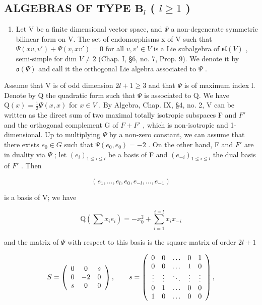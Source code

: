\subsection{\texorpdfstring{ALGEBRAS OF TYPE \(\mathbf{B}_l\) ( \(l \geq 1\) )}{ALGEBRAS OF TYPE \textbackslash mathbf\{B\}\_l ( l \textbackslash geq 1 )}}

\begin{enumerate}
\def\labelenumi{(\Roman{enumi})}
\tightlist
\item
  Let V be a finite dimensional vector space, and \(\Psi\) a non-degenerate symmetric bilinear form on V. The set of endomorphisms x of V such that \(\Psi(xv,v') + \Psi(v, xv') = 0\) for all \(v, v' \in V\) is a Lie subalgebra of \(\mathfrak{sl}(V)\) , semi-simple for dim \(V \neq 2\) (Chap. I, §6, no. 7, Prop. 9). We denote it by \(\mathfrak{o}(\Psi)\) and call it the orthogonal Lie algebra associated to \(\Psi\) .
\end{enumerate}

Assume that V is of odd dimension \(2l + 1 \geq 3\) and that \(\Psi\) is of maximum index l. Denote by Q the quadratic form such that \(\Psi\) is associated to Q. We have \(\mathrm{Q}(x)=\frac{1}{2}\varPsi(x,x)\) for \(x\in V\) . By Algebra, Chap. IX, §4, no. 2, V can be written as the direct sum of two maximal totally isotropic subspaces F and \(F'\) and the orthogonal complement G of \(F+F'\) , which is non-isotropic and 1-dimensional. Up to multiplying \(\varPsi\) by a non-zero constant, we can assume that there exists \(e_{0}\in G\) such that \(\varPsi(e_{0},e_{0})=-2\) . On the other hand, F and \(F'\) are in duality via \(\varPsi\) ; let \((e_{i})_{1\leq i\leq l}\) be a basis of F and \((e_{-i})_{1\leq i\leq l}\) the dual basis of \(F'\) . Then

\[
(e _ {1}, \ldots , e _ {l}, e _ {0}, e _ {- l}, \ldots , e _ {- 1})
\]

is a basis of V; we have

\[
\mathrm{Q} \left(\sum x _ {i} e _ {i}\right) = - x _ {0} ^ {2} + \sum_ {i = 1} ^ {i = l} x _ {i} x _ {- i}
\]

and the matrix of \(\varPsi\) with respect to this basis is the square matrix of order \(2l + 1\)

\[
S = \left( \begin{array}{c c c} 0 & 0 & s \\ 0 & - 2 & 0 \\ s & 0 & 0 \end{array} \right), \qquad s = \left( \begin{array}{c c c c c} 0 & 0 & \dots & 0 & 1 \\ 0 & 0 & \dots & 1 & 0 \\ \vdots & \vdots & \ddots & \vdots & \vdots \\ 0 & 1 & \dots & 0 & 0 \\ 1 & 0 & \dots & 0 & 0 \end{array} \right),
\]


